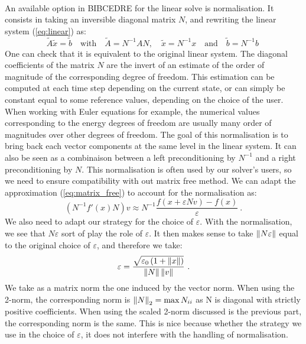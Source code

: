 
      \paragraph{}
      An available option in BIBCEDRE for the linear solve is normalisation.
      It consists in taking an inversible diagonal matrix $N$, and rewriting the linear system (\ref{eq:linear}) as:
      \begin{equation}
        \tilde{A}\tilde{x} = \tilde{b}
        \quad\textrm{with}\quad \tilde{A} = N^{-1} A N,
        \quad \tilde{x} = N^{-1} x
        \quad\textrm{and}\quad \tilde{b} = N^{-1} b \
      \end{equation}
      One can check that it is equivalent to the original linear system.
      The diagonal coefficients of the matrix $N$ are the invert of an estimate of the order of magnitude of the corresponding degree of freedom. 
      This estimation can be computed at each time step depending on the current state, or can simply be constant equal to some reference values, depending on the choice of the user.
      When working with Euler equations for example, the numerical values corresponding to the energy degrees of freedom are usually many order of magnitudes over other degrees of freedom.
      The goal of this normalisation is to bring back each vector components at the same level in the linear system.
      It can also be seen as a combinaison between a left preconditioning by $N^{-1}$ and a right preconditioning by $N$.
      This normalisation is often used by our solver's users, so we need to ensure compatibility with out matrix free method.
      We can adapt the approximation (\ref{eq:matrix_free}) to account for the normalisation as:
      \begin{equation}
        \left( N^{-1} f'\left(x\right) N \right) v \approx N^{-1} \frac{f\left(x + \varepsilon N v\right) - f\left(x\right)}{\varepsilon} \ .
      \end{equation}
      We also need to adapt our strategy for the choice of $\varepsilon$.
      With the normalisation, we see that $N \varepsilon$ sort of play the role of $\varepsilon$.
      It then makes sense to take $\norm{N \varepsilon}$ equal to the original choice of $\varepsilon$, and therefore we take:
      \begin{equation}
        \varepsilon = \frac{\sqrt{\varepsilon_0 \left(1 + \norm{x}\right) }}{\norm{N} \norm{v}} \ .
      \end{equation}
      We take as a matrix norm the one induced by the vector norm.
      When using the 2-norm, the corresponding norm is $\norm[2]{N} = \max{N_{ii}}$ as N is diagonal with strictly positive coefficients.
      When using the scaled 2-norm discussed is the previous part, the corresponding norm is the same.
      This is nice because whether the strategy we use in the choice of $\varepsilon$, it does not interfere with the handling of normalisation.
